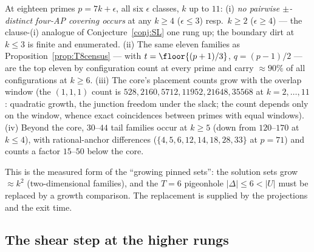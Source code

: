 \begin{proposition}[the $T=7$ census; machine]\label{prop:T7census}
At eighteen primes $p=7k+\epsilon$, all six $\epsilon$ classes, $k$ up
to $11$: (i) \emph{no pairwise $\pm$-distinct four-AP covering occurs}
at any $k\ge4$ ($\epsilon\le3$) resp.\ $k\ge2$ ($\epsilon\ge4$) --- the
clause-(i) analogue of Conjecture~\ref{conj:SL} one rung up; the
boundary dirt at $k\le3$ is finite and enumerated. (ii) The same eleven
families as Proposition~\ref{prop:T8census} --- with
$t=\floor{(p+1)/3}$, $q=(p-1)/2$ --- are the top eleven by
configuration count at every prime and carry $\approx90\%$ of all
configurations at $k\ge6$. (iii) The core's placement counts grow with
the overlap window (the $(1,1,1)$ count is
$528,2160,5712,11952,21648,35568$ at $k=2,\dots,11$: quadratic growth,
the junction freedom under the slack; the count depends only on the
window, whence exact coincidences between primes with equal windows).
(iv) Beyond the core, $30$--$44$ tail families occur at $k\ge5$ (down
from $120$--$170$ at $k\le4$), with rational-anchor differences
($\{4,5,6,12,14,18,28,33\}$ at $p=71$) and counts a factor $15$--$50$
below the core.
\end{proposition}

This is the measured form of the ``growing pinned sets'': the solution
sets grow $\approx k^2$ (two-dimensional families), and the $T=6$
pigeonhole $|\Delta|\le6<|U|$ must be replaced by a growth comparison.
The replacement is supplied by the projections and the exit time.

\subsection{The shear step at the higher rungs}

